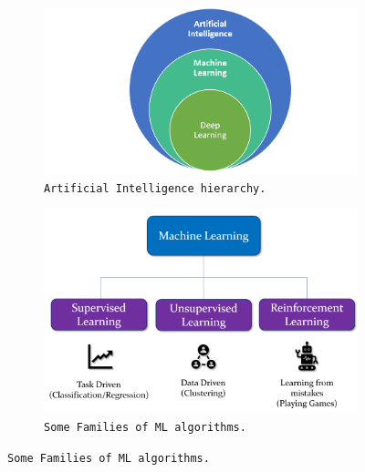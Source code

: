 \begin{figure}[ht]
    \begin{subfigure}[b]{0.45\textwidth}
        \includegraphics[width=\textwidth]{images/background/ai_ml_dl}
        \caption{\texttt{Artificial Intelligence hierarchy.}}
        \label{fig:ml_hierarchy}
    \end{subfigure}
    \hfill
    \begin{subfigure}[b]{0.45\textwidth}
        \includegraphics[width=\textwidth]{images/background/ML_Types}
        \caption{\texttt{Some Families of ML algorithms.}}
        \label{fig:ml_types}
    \end{subfigure}
    \hfill
    
\end{figure}








